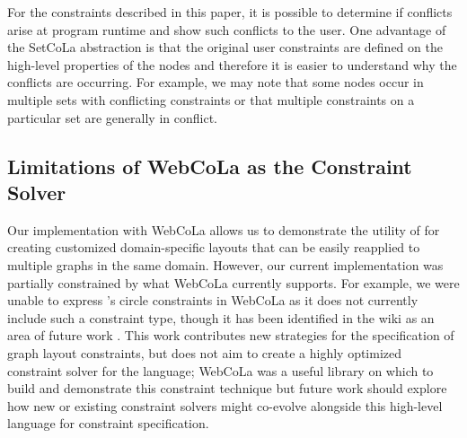 For the constraints described in this paper, it is possible to determine if
conflicts arise at program runtime and show such conflicts to the user. One
advantage of the SetCoLa abstraction is that the original user constraints
are defined on the high-level properties of the nodes and therefore it is
easier to understand why the conflicts are occurring. For example, we may
note that some nodes occur in multiple sets with conflicting constraints
or that multiple constraints on a particular set are generally in conflict.

\subsection{Limitations of WebCoLa as the Constraint Solver}



Our implementation with WebCoLa allows us to demonstrate the utility of
\projectname for creating customized domain-specific layouts that can be
easily reapplied to multiple graphs in the same domain. However, our current
implementation was partially constrained by what WebCoLa currently supports. For
example, we were unable to express \projectname's circle constraints in
WebCoLa as it does not currently include such a constraint type, though it
has been identified in the wiki as an area of future work
. This work contributes new strategies for the
specification of graph layout constraints, but does not aim to create a
highly optimized constraint solver for the language; WebCoLa was a useful
library on which to build and demonstrate this constraint technique but 
future work should explore how new or existing constraint solvers might
co-evolve alongside this high-level language for constraint specification.


